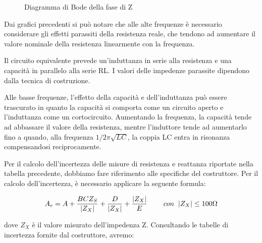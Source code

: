 \begin{figure}[h]
    \centering
    \caption{Diagramma di Bode della fase di Z}
    \label{fig:fase}
\end{figure}
\FloatBarrier
\clearpage

Dai grafici precedenti si può notare che alle alte frequenze è necessario considerare gli effetti parassiti della resistenza reale, che tendono ad aumentare il valore nominale della resistenza linearmente con la frequenza.

Il circuito equivalente prevede un'induttanza in serie alla resistenza e una capacità in parallelo alla serie RL. I valori delle impedenze parassite dipendono dalla tecnica di costruzione.

Alle basse frequenze, l'effetto della capacità e dell'induttanza può essere trascurato in quanto la capacità si comporta come un circuito aperto e l'induttanza come un cortocircuito. Aumentando la frequenza, la capacità tende ad abbassare il valore della resistenza, mentre l'induttore tende ad aumentarlo fino a quando, alla frequenza $1/2\pi\sqrt{LC}$, la coppia LC entra in risonanza compensandosi reciprocamente.

Per il calcolo dell'incertezza delle misure di resistenza e reattanza riportate nella tabella precedente, dobbiamo fare riferimento alle specifiche del costruttore. Per il calcolo dell'incertezza, è necessario applicare la seguente formula:

\begin{equation}
    A_e = A + \frac{BCZ_S}{|Z_X|} + \frac{D}{|Z_X|} + \frac{|Z_X|}{E} \hspace{0,8cm} con \hspace{0,2cm} |Z_X| \leq 100\Omega
\end{equation}

dove $Z_X$ è il valore misurato dell’impedenza Z. Consultando le tabelle di incertezza fornite dal costruttore, avremo:


